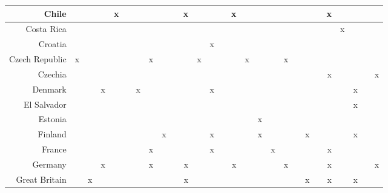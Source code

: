 {\begin{longtable}{|r|r|r|r|r|r|r|r|r|r|r|r|r|r|r|r|r|r|r|r|r|r|r|r|r|r|r|}
Chile &     &     &     &    x &     &     &     &     &     &    x &     &     &     &    x &     &     &     &     &     &     &     &    x &     &     &     &     \\ \midrule
Costa Rica &     &     &     &     &     &     &     &     &     &     &     &     &     &     &     &     &     &     &     &     &     &     &    x &     &     &     \\ \midrule
Croatia &     &     &     &     &     &     &     &     &     &     &     &    x &     &     &     &     &     &     &     &     &     &     &     &     &     &     \\ \midrule
Czech Republic &    x &     &     &     &     &     &    x &     &     &     &    x &     &     &     &    x &     &     &    x &     &     &     &     &     &     &     &     \\ \midrule
Czechia &     &     &     &     &     &     &     &     &     &     &     &     &     &     &     &     &     &     &     &     &     &    x &     &     &     &    x \\ \midrule
Denmark &     &     &    x &     &     &    x &     &     &     &     &     &    x &     &     &     &     &     &     &     &     &     &     &     &    x &     &     \\ \midrule
El Salvador &     &     &     &     &     &     &     &     &     &     &     &     &     &     &     &     &     &     &     &     &     &     &     &    x &     &     \\ \midrule
Estonia &     &     &     &     &     &     &     &     &     &     &     &     &     &     &     &    x &     &     &     &     &     &     &     &     &     &     \\ \midrule
Finland &     &     &     &     &     &     &     &    x &     &     &     &    x &     &     &     &    x &     &     &     &    x &     &     &     &    x &     &     \\ \midrule
France &     &     &     &     &     &     &    x &     &     &     &     &    x &     &     &     &     &    x &     &     &     &     &    x &     &     &     &     \\ \midrule
Germany &     &     &    x &     &     &     &    x &     &     &    x &     &     &     &    x &     &     &     &    x &     &     &     &    x &     &     &     &    x \\ \midrule
Great Britain &     &    x &     &     &     &     &     &     &     &    x &     &     &     &     &     &     &     &     &     &    x &     &    x &     &    x &     &     \\ \midrule

\end{longtable}}
